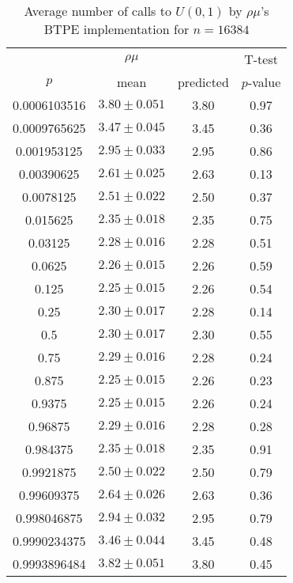 \begin{table}[t]
\caption{Average number of calls to $U(0,1)$ by $\rho\mu$'s BTPE implementation for $n=16384$}
\label{tab:calls16384}
\begin{tabular}{cccc} \hline
    & $\rho\mu$ & & T-test \\
$p$ & mean & predicted & $p$-value \\ \hline
0.0006103516 & $3.80 \pm 0.051$ & 3.80 & 0.97 \\
0.0009765625 & $3.47 \pm 0.045$ & 3.45 & 0.36 \\
0.001953125  & $2.95 \pm 0.033$ & 2.95 & 0.86 \\
0.00390625   & $2.61 \pm 0.025$ & 2.63 & 0.13 \\
0.0078125    & $2.51 \pm 0.022$ & 2.50 & 0.37 \\
0.015625     & $2.35 \pm 0.018$ & 2.35 & 0.75 \\
0.03125      & $2.28 \pm 0.016$ & 2.28 & 0.51 \\
0.0625       & $2.26 \pm 0.015$ & 2.26 & 0.59 \\
0.125        & $2.25 \pm 0.015$ & 2.26 & 0.54 \\
0.25         & $2.30 \pm 0.017$ & 2.28 & 0.14 \\
0.5          & $2.30 \pm 0.017$ & 2.30 & 0.55 \\
0.75         & $2.29 \pm 0.016$ & 2.28 & 0.24 \\
0.875        & $2.25 \pm 0.015$ & 2.26 & 0.23 \\
0.9375       & $2.25 \pm 0.015$ & 2.26 & 0.24 \\
0.96875      & $2.29 \pm 0.016$ & 2.28 & 0.28 \\
0.984375     & $2.35 \pm 0.018$ & 2.35 & 0.91 \\
0.9921875    & $2.50 \pm 0.022$ & 2.50 & 0.79 \\
0.99609375   & $2.64 \pm 0.026$ & 2.63 & 0.36 \\
0.998046875  & $2.94 \pm 0.032$ & 2.95 & 0.79 \\
0.9990234375 & $3.46 \pm 0.044$ & 3.45 & 0.48 \\
0.9993896484 & $3.82 \pm 0.051$ & 3.80 & 0.45 \\
\hline
\end{tabular}
\end{table}

